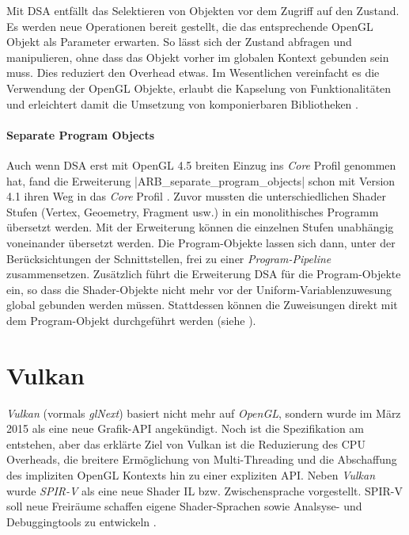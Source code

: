 Mit \ac{DSA} entfällt das Selektieren von Objekten vor dem Zugriff auf den Zustand. Es werden neue Operationen bereit gestellt, die das entsprechende OpenGL Objekt als Parameter erwarten. So lässt sich der Zustand abfragen und manipulieren, ohne dass das Objekt vorher im globalen Kontext gebunden sein muss. Dies reduziert den Overhead etwas. Im Wesentlichen vereinfacht es die Verwendung der OpenGL Objekte, erlaubt die Kapselung von Funktionalitäten und erleichtert damit die Umsetzung von komponierbaren Bibliotheken .

\paragraph{Separate Program Objects} Auch wenn \ac{DSA} erst mit OpenGL 4.5 breiten Einzug ins \textit{Core} Profil genommen hat, fand die Erweiterung |ARB_separate_program_objects| schon mit Version 4.1 ihren Weg in das \textit{Core} Profil \parencite{Akeley2010}. Zuvor mussten die unterschiedlichen Shader Stufen (Vertex, Geoemetry, Fragment usw.) in ein monolithisches Programm übersetzt werden. Mit der Erweiterung können die einzelnen Stufen unabhängig voneinander übersetzt werden. Die Program-Objekte lassen sich dann, unter der Berücksichtungen der Schnittstellen, frei zu einer \textit{Program-Pipeline} zusammensetzen. Zusätzlich führt die Erweiterung \ac{DSA} für die Program-Objekte ein, so dass die Shader-Objekte nicht mehr vor der Uniform-Variablenzuwesung global gebunden werden müssen. Stattdessen können die Zuweisungen direkt mit dem Program-Objekt durchgeführt werden (siehe ).


\section{Vulkan}\label{sec:vulkan}

\textit{Vulkan} (vormals \textit{glNext}) basiert nicht mehr auf \textit{OpenGL}, sondern wurde im März 2015 als eine neue Grafik-API angekündigt. Noch ist die Spezifikation am entstehen, aber das erklärte Ziel von Vulkan ist die Reduzierung des CPU Overheads, die breitere Ermöglichung von Multi-Threading und die Abschaffung des impliziten OpenGL Kontexts hin zu einer expliziten API. Neben \textit{Vulkan} wurde \textit{SPIR-V} als eine neue Shader \ac{IL} bzw. Zwischensprache vorgestellt. SPIR-V soll neue Freiräume schaffen eigene Shader-Sprachen sowie Analsyse- und Debuggingtools zu entwickeln \parencite{Olson2015}.

